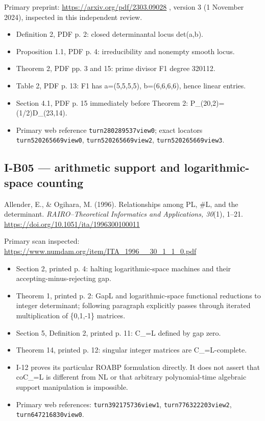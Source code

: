 \documentclass[11pt,a4paper]{article}
\providecommand{\tightlist}{\setlength{\itemsep}{0pt}\setlength{\parskip}{0pt}}
\theoremstyle{definition}\newtheorem{definition}{Definition}
\begin{document}
Primary preprint: \url{https://arxiv.org/pdf/2303.09028} , version 3 (1
November 2024), inspected in this independent review.

\begin{itemize}
\tightlist
\item
  Definition 2, PDF p. 2: closed determinantal locus det(a,b).
\item
  Proposition 1.1, PDF p. 4: irreducibility and nonempty smooth locus.
\item
  Theorem 2, PDF pp. 3 and 15: prime divisor F1 degree 320112.
\item
  Table 2, PDF p. 13: F1 has a=(5,5,5,5), b=(6,6,6,6), hence linear
  entries.
\item
  Section 4.1, PDF p. 15 immediately before Theorem 2:
  P\_(20,2)=(1/2)D\_(23,14).
\item
  Primary web reference \texttt{turn280289537view0}; exact locators
  \texttt{turn520265669view0}, \texttt{turn520265669view2},
  \texttt{turn520265669view3}.
\end{itemize}

\subsection{I-B05 --- arithmetic support and logarithmic-space
counting}\label{i-b05--arithmetic-support-and-logarithmic-space-counting}

Allender, E., \& Ogihara, M. (1996). Relationships among PL, \#L, and
the determinant. \emph{RAIRO--Theoretical Informatics and Applications,
30}(1), 1--21. \url{https://doi.org/10.1051/ita/1996300100011}

Primary scan inspected:
\url{https://www.numdam.org/item/ITA_1996__30_1_1_0.pdf}

\begin{itemize}
\tightlist
\item
  Section 2, printed p. 4: halting logarithmic-space machines and their
  accepting-minus-rejecting gap.
\item
  Theorem 1, printed p. 2: GapL and logarithmic-space functional
  reductions to integer determinant; following paragraph explicitly
  passes through iterated multiplication of \{0,1,-1\} matrices.
\item
  Section 5, Definition 2, printed p. 11: C\_=L defined by gap zero.
\item
  Theorem 14, printed p. 12: singular integer matrices are
  C\_=L-complete.
\item
  I-12 proves its particular ROABP formulation directly. It does not
  assert that coC\_=L is different from NL or that arbitrary
  polynomial-time algebraic support manipulation is impossible.
\item
  Primary web references: \texttt{turn392175736view1},
  \texttt{turn776322203view2}, \texttt{turn647216830view0}.
\end{itemize}
\end{document}
